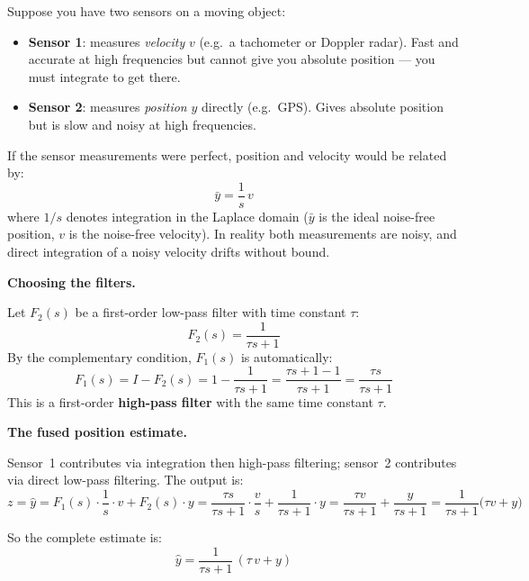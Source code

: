 \documentclass[12pt, a4paper]{article}
\begin{document}
Suppose you have two sensors on a moving object:
\begin{itemize}[leftmargin=1.4em, itemsep=2pt]
  \item \textbf{Sensor 1}: measures \emph{velocity} $v$ (e.g.\ a tachometer
    or Doppler radar). Fast and accurate at high frequencies but cannot give
    you absolute position --- you must integrate to get there.
  \item \textbf{Sensor 2}: measures \emph{position} $y$ directly
    (e.g.\ GPS). Gives absolute position but is slow and noisy at high
    frequencies.
\end{itemize}

If the sensor measurements were perfect, position and velocity would be
related by:
\[
  \bar{y} = \frac{1}{s}\, v
\]
where $1/s$ denotes integration in the Laplace domain
($\bar{y}$ is the ideal noise-free position, $v$ is the noise-free velocity).
In reality both measurements are noisy, and direct integration of a noisy
velocity drifts without bound.

\textbf{Choosing the filters.}

Let $F_2(s)$ be a first-order low-pass filter with time constant $\tau$:
\[
  F_2(s) = \frac{1}{\tau s + 1}
\]
By the complementary condition, $F_1(s)$ is automatically:
\[
  F_1(s)
  = I - F_2(s)
  = 1 - \frac{1}{\tau s + 1}
  = \frac{\tau s + 1 - 1}{\tau s + 1}
  = \frac{\tau s}{\tau s + 1}
\]
This is a first-order \textbf{high-pass filter} with the same time constant
$\tau$.

\textbf{The fused position estimate.}

Sensor~1 contributes via integration then high-pass filtering;
sensor~2 contributes via direct low-pass filtering.
The output is:
\[
  z = \hat{y}
    = F_1(s)\cdot\frac{1}{s}\cdot v + F_2(s)\cdot y
    = \frac{\tau s}{\tau s+1}\cdot\frac{v}{s}
      + \frac{1}{\tau s+1}\cdot y
    = \frac{\tau v}{\tau s+1} + \frac{y}{\tau s+1}
    = \frac{1}{\tau s+1}\bigl(\tau v + y\bigr)
\]

So the complete estimate is:
\[
  \boxed{\hat{y} = \frac{1}{\tau s + 1}\,(\tau\, v + y)}
\]
\end{document}
